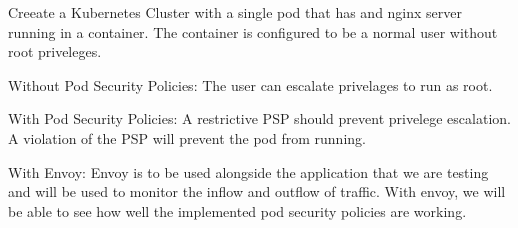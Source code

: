 Creeate a Kubernetes Cluster with a single pod that has and nginx server
running in a container. The container is configured to be a normal user
without root priveleges.

Without Pod Security Policies:
The user can escalate privelages to run as root.

With Pod Security Policies:
A restrictive PSP should prevent privelege escalation.
A violation of the PSP will prevent the pod from running.

With Envoy:
Envoy is to be used alongside the application that we are testing and
will be used to monitor the inflow and outflow of traffic. With envoy,
we will be able to see how well the implemented pod security policies
are working.
